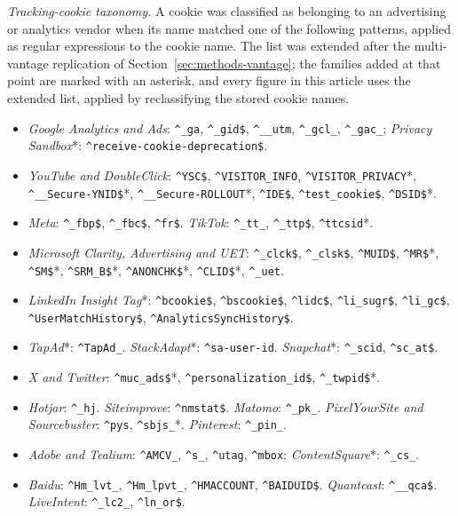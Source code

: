 \documentclass[pdflatex,sn-basic,Numbered]{sn-jnl}
\theoremstyle{thmstyleone}
\theoremstyle{thmstyletwo}
\theoremstyle{thmstylethree}
\begin{document}
\begin{appendices}
\emph{Tracking-cookie taxonomy.} A cookie was classified as belonging to an advertising or analytics vendor when its name matched one of the following patterns, applied as regular expressions to the cookie name. The list was extended after the multi-vantage replication of Section~\ref{sec:methods-vantage}; the families added at that point are marked with an asterisk, and every figure in this article uses the extended list, applied by reclassifying the stored cookie names.

\begin{itemize}
	\item \emph{Google Analytics and Ads}: \verb|^_ga|, \verb|^_gid$|, \verb|^__utm|, \verb|^_gcl_|, \verb|^_gac_|; \emph{Privacy Sandbox}*: \verb|^receive-cookie-deprecation$|.
	\item \emph{YouTube and DoubleClick}: \verb|^YSC$|, \verb|^VISITOR_INFO|, \verb|^VISITOR_PRIVACY|*, \verb|^__Secure-YNID$|*, \verb|^__Secure-ROLLOUT|*, \verb|^IDE$|, \verb|^test_cookie$|, \verb|^DSID$|*.
	\item \emph{Meta}: \verb|^_fbp$|, \verb|^_fbc$|, \verb|^fr$|. \emph{TikTok}: \verb|^_tt_|, \verb|^_ttp$|, \verb|^ttcsid|*.
	\item \emph{Microsoft Clarity, Advertising and UET}: \verb|^_clck$|, \verb|^_clsk$|, \verb|^MUID$|, \verb|^MR$|*, \verb|^SM$|*, \verb|^SRM_B$|*, \verb|^ANONCHK$|*, \verb|^CLID$|*, \verb|^_uet|.
	\item \emph{LinkedIn Insight Tag}*: \verb|^bcookie$|, \verb|^bscookie$|, \verb|^lidc$|, \verb|^li_sugr$|, \verb|^li_gc$|, \verb|^UserMatchHistory$|, \verb|^AnalyticsSyncHistory$|.
	\item \emph{TapAd}*: \verb|^TapAd_|. \emph{StackAdapt}*: \verb|^sa-user-id|. \emph{Snapchat}*: \verb|^_scid|, \verb|^sc_at$|.
	\item \emph{X and Twitter}: \verb|^muc_ads$|*, \verb|^personalization_id$|, \verb|^_twpid$|*.
	\item \emph{Hotjar}: \verb|^_hj|. \emph{Siteimprove}: \verb|^nmstat$|. \emph{Matomo}: \verb|^_pk_|. \emph{PixelYourSite and Sourcebuster}: \verb|^pys|, \verb|^sbjs_|*. \emph{Pinterest}: \verb|^_pin_|.
	\item \emph{Adobe and Tealium}: \verb|^AMCV_|, \verb|^s_|, \verb|^utag|, \verb|^mbox|; \emph{ContentSquare}*: \verb|^_cs_|.
	\item \emph{Baidu}: \verb|^Hm_lvt_|, \verb|^Hm_lpvt_|, \verb|^HMACCOUNT|, \verb|^BAIDUID$|. \emph{Quantcast}: \verb|^__qca$|. \emph{LiveIntent}: \verb|^_lc2_|, \verb|^ln_or$|.
\end{itemize}


\end{appendices}
\end{document}
